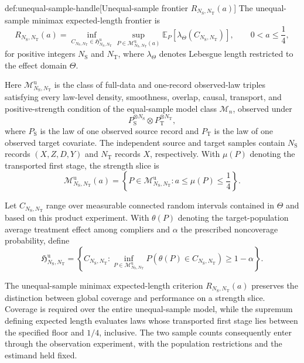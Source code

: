 \begin{definitionv}{def:unequal-sample-handle}[Unequal-sample frontier \(R_{N_{\mathrm S},N_{\mathrm T}}(a)\)]
The unequal-sample minimax expected-length frontier is
\[
R_{N_{\mathrm S},N_{\mathrm T}}(a)
=
\inf_{C_{N_{\mathrm S},N_{\mathrm T}}\in
\mathfrak H^{\mathrm u}_{N_{\mathrm S},N_{\mathrm T}}}
\sup_{P\in\mathcal M^{\mathrm u}_{N_{\mathrm S},N_{\mathrm T}}(a)}
\mathbb E_P\!\left[
\lambda_{\Theta}\!\left(C_{N_{\mathrm S},N_{\mathrm T}}\right)
\right],
\qquad
0<a\le\frac14,
\]
for positive integers \(N_{\mathrm S}\) and \(N_{\mathrm T}\), where \(\lambda_{\Theta}\) denotes Lebesgue length restricted to the effect domain \(\Theta\).

Here \(\mathcal M^{\mathrm u}_{N_{\mathrm S},N_{\mathrm T}}\) is the class of full-data and one-record observed-law triples satisfying every law-level density, smoothness, overlap, causal, transport, and positive-strength condition of the equal-sample model class \(\mathcal M_n\), observed under
\[
P_{\mathrm S}^{\otimes N_{\mathrm S}}
\otimes
P_{\mathrm T}^{\otimes N_{\mathrm T}},
\]
where \(P_{\mathrm S}\) is the law of one observed source record and \(P_{\mathrm T}\) is the law of one observed target covariate. The independent source and target samples contain \(N_{\mathrm S}\) records \((X,Z,D,Y)\) and \(N_{\mathrm T}\) records \(X\), respectively. With \(\mu(P)\) denoting the transported first stage, the strength slice is
\[
\mathcal M^{\mathrm u}_{N_{\mathrm S},N_{\mathrm T}}(a)
=
\left\{
P\in\mathcal M^{\mathrm u}_{N_{\mathrm S},N_{\mathrm T}}:
a\le\mu(P)\le\frac14
\right\}.
\]

Let \(C_{N_{\mathrm S},N_{\mathrm T}}\) range over measurable connected random intervals contained in \(\Theta\) and based on this product experiment. With \(\theta(P)\) denoting the target-population average treatment effect among compliers and \(\alpha\) the prescribed noncoverage probability, define
\[
\mathfrak H^{\mathrm u}_{N_{\mathrm S},N_{\mathrm T}}
=
\left\{
C_{N_{\mathrm S},N_{\mathrm T}}:
\inf_{P\in\mathcal M^{\mathrm u}_{N_{\mathrm S},N_{\mathrm T}}}
P\!\left(
\theta(P)\in C_{N_{\mathrm S},N_{\mathrm T}}
\right)
\ge1-\alpha
\right\}.
\]
\end{definitionv}

The unequal-sample minimax expected-length criterion \(R_{N_{\mathrm S},N_{\mathrm T}}(a)\) preserves the distinction between global coverage and performance on a strength slice. Coverage is required over the entire unequal-sample model, while the supremum defining expected length evaluates laws whose transported first stage lies between the specified floor and \(1/4\), inclusive. The two sample counts consequently enter through the observation experiment, with the population restrictions and the estimand held fixed.

